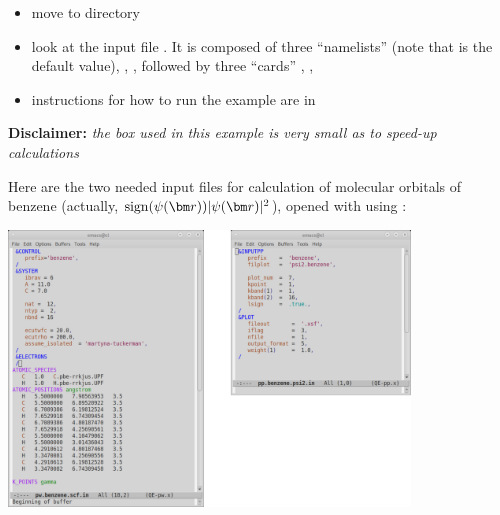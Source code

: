 \documentclass[landscape]{foils}
\begin{document}
\begin{itemize}
\item move to  directory
  \vspace{-0.5em}
\item look at the input file . It is composed of three
``namelists''  (note that 
is the default value), , , followed 
by three ``cards'' , ,
  \vspace{-0.5em}
\item instructions for how to run the example are in 
\end{itemize}
{\bf Disclaimer:} {\em the box used in this example is very small as to speed-up calculations}


Here are the two needed input files for calculation of molecular
orbitals of benzene (actually, $\sign(\psi(\vr))|\psi(\vr)|^2$),
opened with  using  :
\begin{center}
  \includegraphics[width=0.8\textwidth]{figs/inputs-benzene.png}
\end{center}

\end{document}
